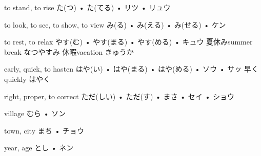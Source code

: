 



\setcounter{cardnum}{65}

		{to stand, to rise}
		{た(つ) • た(てる) • リツ • リュウ}
		{}{}
		{}{}
		{}{}
		{}{}
		{}{}

		{to look, to see, to show, to view}
		{み(る) • み(える) • み(せる) • ケン}
		{}{}
		{}{}
		{}{}
		{}{}
		{}{}

		{to rest, to relax}
		{やす(む) • やす(まる) • やす(める) • キュウ}
		{夏休み}{summer break なつやすみ}
		{休暇}{vacation きゅうか}
		{}{}
		{}{}
		{}{}

		{early, quick, to hasten}
		{はや(い) • はや(まる) • はや(める) • ソウ • サッ}
		{早く}{quickly はやく}
		{}{}
		{}{}
		{}{}
		{}{}

		{right, proper, to correct}
		{ただ(しい) • ただ(す) • まさ • セイ • ショウ}
		{}{}
		{}{}
		{}{}
		{}{}
		{}{}

		{village}
		{むら • ソン}
		{}{}
		{}{}
		{}{}
		{}{}
		{}{}

		{town, city}
		{まち • チョウ}
		{}{}
		{}{}
		{}{}
		{}{}
		{}{}

		{year, age}
		{とし • ネン}
		{}{}
		{}{}
		{}{}
		{}{}
		{}{}

